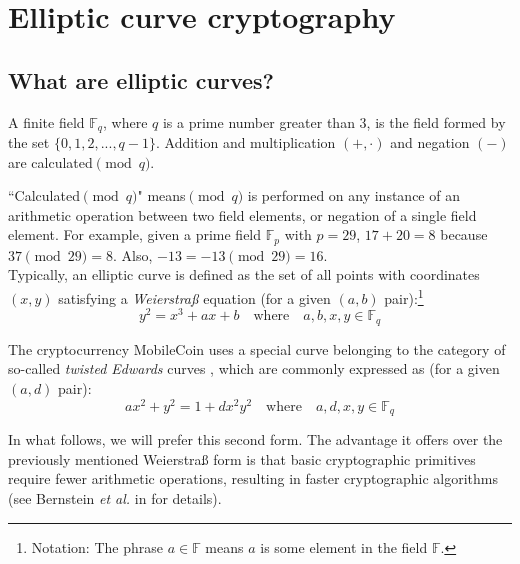 \section{Elliptic curve cryptography}
\label{sec:EllipticCurveCryptography}


\subsection{What are elliptic curves?}
\label{subsec:elliptic_curves_section}

A finite field \(\mathbb{F}_q\), where \(q\) is a prime number greater than 3, is the field formed by the set \(\{0, 1, 2, ..., q-1\}\). Addition and multiplication \((+,  \cdot)\) and negation $(-)$ are calculated\( \pmod q\).

``Calculated\( \pmod q\)" means\( \pmod q\) is performed on any instance of an arithmetic operation between two field elements, or negation of a single field element. For example, given a prime field \(\mathbb{F}_p\) with $p = 29$, $17+20=8$ because $37 \pmod{29} = 8$. Also, $-13 = -13 \pmod{29} = 16$.\\

Typically, an elliptic curve is defined as the set of all points with coordinates \((x, y)\) satisfying a {\em Weierstraß} equation \cite{Hankerson:2003:GEC:940321} (for a given $(a,b)$ pair):\footnote{\label{notation1}Notation: The phrase $a \in \mathbb{F}$ means $a$ is some element in the field $\mathbb{F}$.}\vspace{.175cm}
\[y^2 = x^3 + a x + b \quad \textrm{where} \quad a, b, x, y \in \mathbb{F}_q\]

The cryptocurrency MobileCoin uses a special curve belonging to the category of so-called {\em twisted Edwards} curves \cite{Bernstein2008-twisted-edwards}, which are commonly expressed as (for a given $(a,d)$ pair):\vspace{.175cm}
\[a x^2 + y^2 = 1 + d x^2 y^2 \quad \textrm{where} \quad a, d, x, y \in \mathbb{F}_q \]

In what follows, we will prefer this second form. The advantage it offers over the previously mentioned Weierstraß form is that basic cryptographic primitives require fewer arithmetic operations, resulting in faster cryptographic algorithms (see Bernstein {\em et al.} in \cite{Bernstein2007-faster-ec-ops} for details).\\

